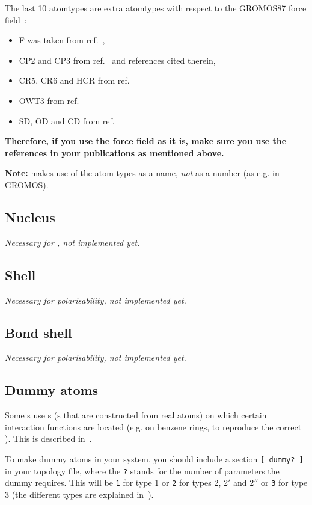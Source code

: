 The last 10 atomtypes are extra atomtypes with respect to the GROMOS87
force field~\cite{biomos}: 
\begin{itemize}
\item F was taken from ref.~\cite{Buuren93a}, 
\item CP2 and CP3 from ref.~\cite{Buuren93b} and references cited therein, 
\item CR5, CR6 and HCR from ref.~\cite{King93}
\item OWT3 from ref.~\cite{Jorgensen83}
\item SD, OD and CD from ref.~\cite{Liu95}
\end{itemize}
{\bf Therefore, if you use the {\gromacs} force field as it is, make
sure you use the references in your publications as mentioned above.}

{\bf Note:} {\gromacs} makes use of the atom types as a name, {\em
not} as a number (as e.g. in GROMOS).

\subsection{Nucleus}
{\em Necessary for , not implemented yet.}

\subsection{Shell}
{\em Necessary for polarisability, not implemented yet.}

\subsection{Bond shell}
{\em Necessary for polarisability, not implemented yet.}

\subsection{Dummy atoms}
\label{sec:dummytop}
Some s use s 
(s that are constructed
from real atoms) on which certain interaction functions are located
(e.g. on benzene rings, to reproduce the correct
). This is described in~.

To make dummy atoms in your system, you should include a section 
\verb'[ dummy? ]' in your topology file, where the \verb'?' stands for
the number of parameters the dummy requires. This will be \verb'1' for
type 1 or \verb'2' for types 2, 2$'$ and 2$''$ or \verb'3' for type 3
(the different types are explained in~).

